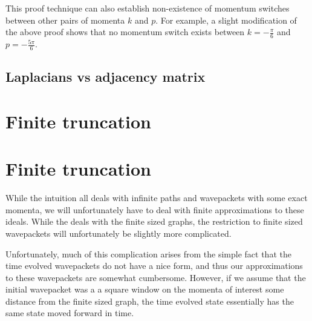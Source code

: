 \documentclass[../thesis-main/thesis-main]{subfiles}
\begin{document}
This proof technique can also establish non-existence of momentum switches between other pairs of momenta $k$ and $p$.  For example, a slight modification of the above proof shows that no momentum switch exists between $k = -\frac{\pi}{6}$ and $p = -\frac{5\pi}{6}$. 

\subsection{Laplacians vs adjacency matrix}


\section{Finite truncation}

\section{Finite truncation}

While the intuition all deals with infinite paths and wavepackets with some exact momenta, we will unfortunately have to deal with finite approximations to these ideals.  While the  deals with the finite sized graphs, the restriction to finite sized wavepackets will unfortunately be slightly more complicated.

Unfortunately, much of this complication arises from the simple fact that the time evolved wavepackets do not have a nice form, and thus our approximations to these wavepackets are somewhat cumbersome.  However, if we assume that the initial wavepacket was a a square window on the momenta of interest some distance from the finite sized graph, the time evolved state essentially has the same state moved forward in time.


\end{document}
